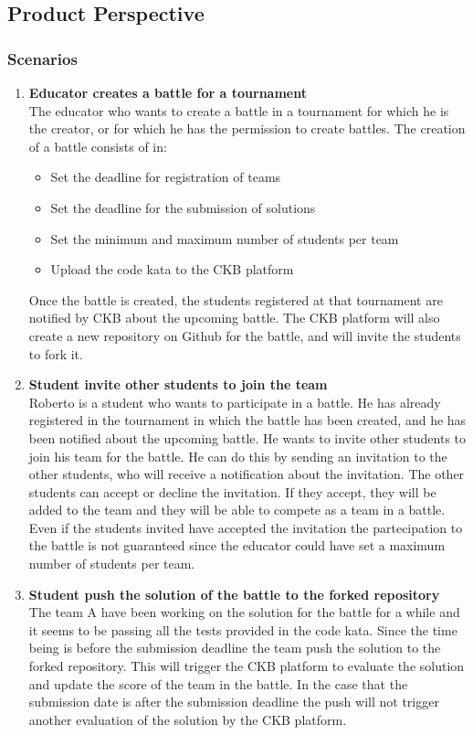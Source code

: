 \subsection{Product Perspective}
\subsubsection{Scenarios}
\begin{enumerate}
    \item \textbf{Educator creates a battle for a tournament} \\
    The educator who wants to create a battle in a tournament for which he is the creator, or for which he has the permission to create battles.
    The creation of a battle consists of in:
    \begin{itemize}
        \item Set the deadline for registration of teams
        \item Set the deadline for the submission of solutions
        \item Set the minimum and maximum number of students per team
        \item Upload the code kata to the CKB platform
    \end{itemize}
    Once the battle is created, the students registered at that tournament are notified by CKB about the upcoming battle. The CKB platform will also create a new repository on Github for the battle, and will invite the students to fork it.
    \item \textbf{Student invite other students to join the team} \\
    Roberto is a student who wants to participate in a battle. He has already registered in the tournament in which the battle has been created, and he has been notified about the upcoming battle. He wants to invite other students to join his team for the battle. He can do this by sending an invitation to the other students, who will receive a notification about the invitation. The other students can accept or decline the invitation. If they accept, they will be added to the team and they will be able to compete as a team in a battle.
    Even if the students invited have accepted the invitation the partecipation to the battle is not guaranteed since the educator could have set a maximum number of students per team.
    \item \textbf{Student push the solution of the battle to the forked repository} \\
    The team A have been working on the solution for the battle for a while and it seems to be passing all the tests provided in the code kata. Since the time being is before the submission deadline the team push the solution to the forked repository. This will trigger the CKB platform to evaluate the solution and update the score of the team in the battle. In the case that the submission date is after the submission deadline the push will not trigger another evaluation of the solution by the CKB platform.

\end{enumerate}
